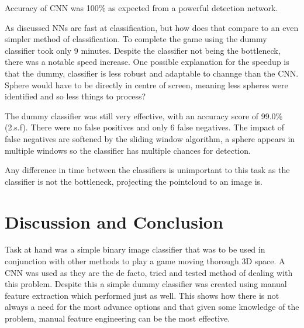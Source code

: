 \documentclass{article}
\begin{document}
Accuracy of CNN was 100\% as expected from a powerful detection network. 

As discussed NNs are fast at classification, but how does that compare to an even simpler method of classification.
To complete the game using the dummy classifier took only 9 minutes.
Despite the classifier not being the bottleneck, there was a notable speed increase.
One possible explanation for the speedup is that the dummy, classifier is less robust and adaptable to channge than the CNN.
Sphere would have to be directly in centre of screen, meaning less spheres were identified and so less things to process?

The dummy classifier was still very effective, with an accuracy score of 99.0\% (2.s.f).
There were no false positives and only 6 false negatives.
The impact of false negatives are softened by the sliding window algorithm, a sphere appears in multiple windows so the classifier has multiple chances for detection. 

 Any difference in time between the classifiers is unimportant to this task as the classifier is not the bottleneck, projecting the pointcloud to an image is.

\section{Discussion and Conclusion}

Task at hand was a simple binary image classifier that was to be used in conjunction with other methods to play a game moving thorough 3D space.
A CNN was used as they are the de facto, tried and tested method of dealing with this problem.
Despite this a simple dummy classifier was created using manual feature extraction which performed just as well.
This shows how there is not always a need for the most advance options and that given some knowledge of the problem, manual feature engineering can be the most effective.

\printbibliography
\end{document}
